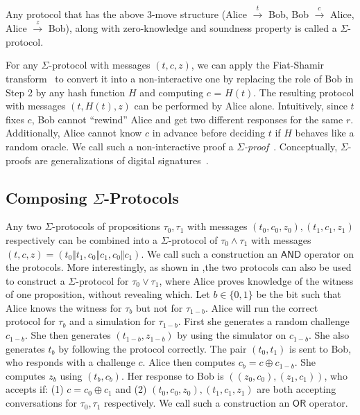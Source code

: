 \documentclass[runningheads]{llncs}
\newcommand{\andnode}{\ensuremath{\mathsf{AND}}}
\newcommand{\ornode}{\ensuremath{\mathsf{OR}}}
\begin{document}
Any protocol that has the above 3-move structure (Alice $\stackrel{t}{\rightarrow}$ Bob, Bob $\stackrel{c}{\rightarrow}$ Alice, Alice $\stackrel{z}{\rightarrow}$ Bob), along with zero-knowledge and soundness property is called a $\Sigma$-protocol. 

For any $\Sigma$-protocol with messages $(t, c, z)$, we can apply the Fiat-Shamir transform~\cite{fiatshamir} to convert it into a non-interactive one by replacing the role of Bob in Step 2 by any hash function $H$ and computing $c$ = $H(t)$. The resulting protocol with messages $(t, H(t), z)$ can be performed by Alice alone. Intuitively, since $t$ fixes $c$, Bob cannot ``rewind'' Alice and get two different responses for the same $r$. Additionally, Alice cannot know $c$ in advance before deciding $t$ if $H$ behaves like a random oracle. We call such a non-interactive proof a {\em $\Sigma$-proof}~\cite{Cra96}. Conceptually, $\Sigma$-proofs are generalizations of digital signatures~\cite{CL06}.

\subsection{Composing $\Sigma$-Protocols}

Any two $\Sigma$-protocols of propositions $\tau_0, \tau_1$ with messages $(t_0, c_0, z_0), (t_1, c_1, z_1)$ respectively can be combined into a $\Sigma$-protocol of $\tau_0 \land \tau_1$ with messages $(t, c, z) = (t_0\Vert t_1,c_0\Vert c_1, c_0\Vert c_1)$. We call such a construction an $\andnode$ operator on the protocols. 
More interestingly, as shown in \cite{CDS94},the two protocols can also be used to construct a $\Sigma$-protocol for $\tau_0\lor \tau_1$, where Alice proves knowledge of the witness of one proposition, without revealing which. Let $b\in \{0, 1\}$ be the bit such that Alice knows the witness for $\tau_b$ but not for $\tau_{1-b}$. Alice will run the correct protocol for $\tau_b$ and a simulation for $\tau_{1-b}$. First she generates a random challenge $c_{1-b}$. She then generates $(t_{1-b}, z_{1-b})$ by using the simulator on $c_{1-b}$. She also generates $t_b$ by following the protocol correctly. The pair $(t_0, t_1)$ is sent to Bob, who responds with a challenge $c$. Alice then computes $c_b = c\oplus c_{1-b}$. She computes $z_b$ using $(t_b, c_b)$. Her response to Bob is $((z_0, c_0), (z_1, c_1))$, who accepts if: (1) $c = c_0 \oplus c_1$ and (2) $(t_0, c_0, z_0), (t_1, c_1, z_1)$ are both accepting conversations for $\tau_0, \tau_1$ respectively. We call such a construction an $\ornode$ operator. 
\end{document}

